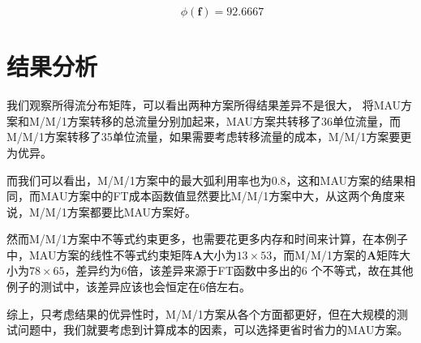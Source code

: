 \documentclass[UTF8]{ctexart}
\begin{document}
\[\qquad \phi(\bm{f})=92.6667\]

\section{结果分析}
我们观察所得流分布矩阵，可以看出两种方案所得结果差异不是很大，
将MAU方案和M/M/1方案转移的总流量分别加起来，MAU方案共转移了36单位流量，而M/M/1方案转移了35单位流量，如果需要考虑转移流量的成本，M/M/1方案要更为优异。

而我们可以看出，M/M/1方案中的最大弧利用率也为0.8，这和MAU方案的结果相同，而MAU方案中的FT成本函数值显然要比M/M/1方案中大，从这两个角度来说，M/M/1方案都要比MAU方案好。

然而M/M/1方案中不等式约束更多，也需要花更多内存和时间来计算，在本例子中，MAU方案的线性不等式约束矩阵$\bm{A}$大小为$13\times 53$，而M/M/1方案的$\bm{A}$矩阵大小为$78\times 65$，差异约为6倍，该差异来源于FT函数中多出的6 个不等式，故在其他例子的测试中，该差异应该也会恒定在6倍左右。

综上，只考虑结果的优异性时，M/M/1方案从各个方面都更好，但在大规模的测试问题中，我们就要考虑到计算成本的因素，可以选择更省时省力的MAU方案。
\end{document}
